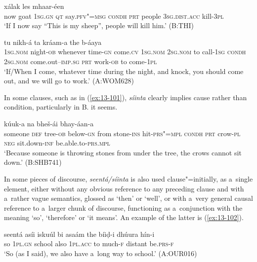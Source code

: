 \begin{exe}
\ex
\label{ex:13-99}
  xálak les mhaar-éen \\
now goat \textsc{1sg.gn} \textsc{qt} say.\textsc{pfv"=msg} \textsc{condh} \textsc{prt} people \textsc{3sg.dist.acc} kill-\textsc{3pl} \\
\glt `If I now say ``This is my sheep'', people will kill him.' (B:THI)

\ex
\label{ex:13-100}
 tu
nikh-á  ta kráam-a the b-áaya \\
\textsc{1sg.nom} night-\textsc{ob} whenever time-\textsc{gn} come.\textsc{cv} \textsc{1sg.nom}  \textsc{2sg.nom} to call-\textsc{1sg} \textsc{condh} \textsc{2sg.nom} come.out--\textsc{imp.sg}  \textsc{prt} work-\textsc{ob} to come-\textsc{1pl} \\
\glt `If/When I come, whatever time during the night, and knock, you should come out, and we will go to work.' (A:WOM628) 
\end{exe}

In some clauses, such as in (\ref{ex:13-101}), \textit{síinta} clearly implies cause rather than condition, particularly in B. it seems.

\begin{exe}
\ex
\label{ex:13-101}
 kúuk-a
na bheš-ái  bhay-áan-a \\
someone \textsc{def} tree-\textsc{ob} below-\textsc{gn} from stone-\textsc{ins}  hit-\textsc{prs"=mpl} \textsc{condh} \textsc{prt} crow-\textsc{pl} \textsc{neg} sit.down-\textsc{inf} be.able.to-\textsc{prs.mpl} \\
\glt `Because someone is throwing stones from under the tree, the crows cannot sit down.' (B:SHB741) 
\end{exe}

In some pieces of discourse, \textit{seentá/síinta} is also used clause"=initially, as a~single element, either without any obvious reference to any preceding clause and with a~rather vague semantics, glossed as `then' or `well', or with a~very general causal reference to a~larger chunk of discourse, functioning as a~conjunction with the meaning `so', `therefore' or `it means'. An example of the latter is (\ref{ex:13-102}).

\begin{exe}
\ex
\label{ex:13-102}
\gll seentá asíi iskuúl bi asaám the bíiḍ-i dhúura  hín-i \\
so \textsc{1pl.gn} school also \textsc{1pl.acc} to much-\textsc{f} distant be.\textsc{prs-f} \\
\glt `So (as I said), we also have a~long way to school.' (A:OUR016) 
\end{exe}

